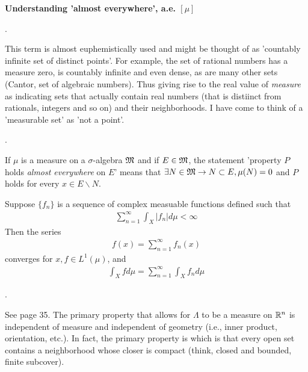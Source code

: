 \documentclass[10pt,a4paper]{report}
\begin{document}
\large{\textbf{Understanding 'almost everywhere', a.e. $[\mu]$}

\begin{remark}.

This term is almost euphemistically used and might be thought of as 'countably infinite set of distinct points'.  For example, the set of rational numbers has a measure zero, is countably infinite and even dense, as are many other sets (Cantor, set of algebraic numbers).  Thus giving rise to the real value of \textit{measure} as indicating sets that actually contain real numbers (that is distiinct from rationals, integers and so on) and their neighborhoods.  I have come to think of a 'measurable set' as 'not a point'.
\end{remark}

\begin{definition}.

If $\mu$ is a measure on a $\sigma$-algebra $\mathfrak{M}$ and if $E \in \mathfrak{M}$, the statement 'property $P$ holds \textit{almost everywhere} on $E$' means that $\exists N\in \mathfrak{M} \to N \subset E, \mu(N)=0$ and $P$ holds for every $x \in E\backslash N$.

\end{definition}

\begin{theorem}
	Suppose $\{f_n\}$ is a sequence of complex measuable functions defined  such that
	\begin{align*}
		\sum_{n=1}^\infty \int_X |f_n|d\mu < \infty
	\end{align*}Then the series
	\begin{align*}
		f(x) = \sum_{n=1}^\infty f_n(x)
	\end{align*}converges for  $x,f \in L^1(\mu)$, and 
	\begin{align*}
		\int_X fd\mu = \sum_{n=1}^\infty\int_X f_n d\mu 
	\end{align*}
\end{theorem}

\begin{remark}.

See page 35.  The primary property that allows for  $\Lambda$ to be a measure on $\mathbb{R}^n$ is independent of measure and independent of geometry (i.e., inner product, orientation, etc.).  In fact, the primary property is  which is that every open set contains a neighborhood whose closer is compact (think, closed and bounded, finite subcover).


\end{remark}}
\end{document}
